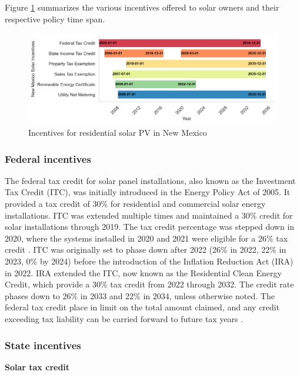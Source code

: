 \documentclass[12pt,twoside,letterpaper]{article}
\begin{document}
Figure \ref{fig:nm_incentive} summarizes the various incentives offered to solar owners and their respective policy time span.

\begin{figure}[H]
    \centering
    \includegraphics[width=1\textwidth]{figures/policy_timeline.png}
    \caption{Incentives for residential solar PV in New Mexico}
    \label{fig:nm_incentive}
\end{figure}

\subsubsection{Federal incentives}


The federal tax credit for solar panel installations, also known as the Investment Tax Credit (ITC), was initially introduced in the Energy Policy Act of 2005. It provided a tax credit of 30\% for residential and commercial solar energy installations. ITC was extended multiple times and maintained a 30\% credit for solar installations through 2019. The tax credit percentage was stepped down in 2020, where the systems installed in 2020 and 2021 were eligible for a 26\% tax credit \parencite{doeitc}. ITC was originally set to phase down after 2022 (26\% in 2022, 22\% in 2023, 0\% by 2024) before the introduction of the Inflation Reduction Act (IRA) in 2022. IRA extended the ITC, now known as the Residential Clean Energy Credit, which provide a 30\% tax credit from 2022 through 2032. The credit rate phases down to 26\% in 2033 and 22\% in 2034, unless otherwise noted. The federal tax credit place in limit on the total amount claimed, and any credit exceeding tax liability can be carried forward to future tax years \parencite{irs}.

\subsubsection{State incentives}

\textbf{Solar tax credit}
\end{document}
